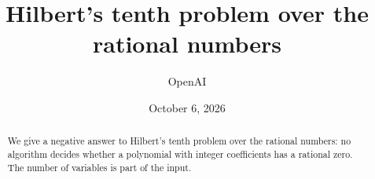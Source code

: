 \documentclass[11pt]{article}
\title{Hilbert's tenth problem over the rational numbers}
\author{OpenAI}
\date{October 6, 2026}
\numberwithin{equation}{section}
\theoremstyle{definition}
\begin{document}
\maketitle
\begin{abstract}
We give a negative answer to Hilbert's tenth problem over the rational numbers:
no algorithm decides whether a polynomial with integer coefficients has a rational
zero. The number of variables is part of the input.
\end{abstract}
\clearpage
{\small\setlength{\parskip}{0pt}\tableofcontents}
\clearpage










\end{document}
